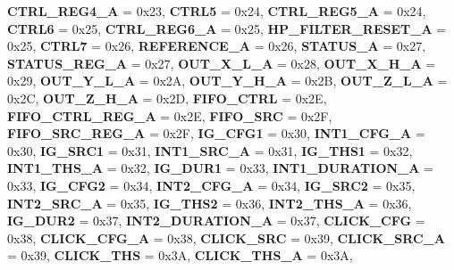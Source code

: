 \begin{DoxyCompactItemize}
{\bfseries C\+T\+R\+L\+\_\+\+R\+E\+G4\+\_\+A} = 0x23, 
{\bfseries C\+T\+R\+L5} = 0x24, 
{\bfseries C\+T\+R\+L\+\_\+\+R\+E\+G5\+\_\+A} = 0x24, 
{\bfseries C\+T\+R\+L6} = 0x25, 
\newline
{\bfseries C\+T\+R\+L\+\_\+\+R\+E\+G6\+\_\+A} = 0x25, 
{\bfseries H\+P\+\_\+\+F\+I\+L\+T\+E\+R\+\_\+\+R\+E\+S\+E\+T\+\_\+A} = 0x25, 
{\bfseries C\+T\+R\+L7} = 0x26, 
{\bfseries R\+E\+F\+E\+R\+E\+N\+C\+E\+\_\+A} = 0x26, 
\newline
{\bfseries S\+T\+A\+T\+U\+S\+\_\+A} = 0x27, 
{\bfseries S\+T\+A\+T\+U\+S\+\_\+\+R\+E\+G\+\_\+A} = 0x27, 
{\bfseries O\+U\+T\+\_\+\+X\+\_\+\+L\+\_\+A} = 0x28, 
{\bfseries O\+U\+T\+\_\+\+X\+\_\+\+H\+\_\+A} = 0x29, 
\newline
{\bfseries O\+U\+T\+\_\+\+Y\+\_\+\+L\+\_\+A} = 0x2A, 
{\bfseries O\+U\+T\+\_\+\+Y\+\_\+\+H\+\_\+A} = 0x2B, 
{\bfseries O\+U\+T\+\_\+\+Z\+\_\+\+L\+\_\+A} = 0x2C, 
{\bfseries O\+U\+T\+\_\+\+Z\+\_\+\+H\+\_\+A} = 0x2D, 
\newline
{\bfseries F\+I\+F\+O\+\_\+\+C\+T\+RL} = 0x2E, 
{\bfseries F\+I\+F\+O\+\_\+\+C\+T\+R\+L\+\_\+\+R\+E\+G\+\_\+A} = 0x2E, 
{\bfseries F\+I\+F\+O\+\_\+\+S\+RC} = 0x2F, 
{\bfseries F\+I\+F\+O\+\_\+\+S\+R\+C\+\_\+\+R\+E\+G\+\_\+A} = 0x2F, 
\newline
{\bfseries I\+G\+\_\+\+C\+F\+G1} = 0x30, 
{\bfseries I\+N\+T1\+\_\+\+C\+F\+G\+\_\+A} = 0x30, 
{\bfseries I\+G\+\_\+\+S\+R\+C1} = 0x31, 
{\bfseries I\+N\+T1\+\_\+\+S\+R\+C\+\_\+A} = 0x31, 
\newline
{\bfseries I\+G\+\_\+\+T\+H\+S1} = 0x32, 
{\bfseries I\+N\+T1\+\_\+\+T\+H\+S\+\_\+A} = 0x32, 
{\bfseries I\+G\+\_\+\+D\+U\+R1} = 0x33, 
{\bfseries I\+N\+T1\+\_\+\+D\+U\+R\+A\+T\+I\+O\+N\+\_\+A} = 0x33, 
\newline
{\bfseries I\+G\+\_\+\+C\+F\+G2} = 0x34, 
{\bfseries I\+N\+T2\+\_\+\+C\+F\+G\+\_\+A} = 0x34, 
{\bfseries I\+G\+\_\+\+S\+R\+C2} = 0x35, 
{\bfseries I\+N\+T2\+\_\+\+S\+R\+C\+\_\+A} = 0x35, 
\newline
{\bfseries I\+G\+\_\+\+T\+H\+S2} = 0x36, 
{\bfseries I\+N\+T2\+\_\+\+T\+H\+S\+\_\+A} = 0x36, 
{\bfseries I\+G\+\_\+\+D\+U\+R2} = 0x37, 
{\bfseries I\+N\+T2\+\_\+\+D\+U\+R\+A\+T\+I\+O\+N\+\_\+A} = 0x37, 
\newline
{\bfseries C\+L\+I\+C\+K\+\_\+\+C\+FG} = 0x38, 
{\bfseries C\+L\+I\+C\+K\+\_\+\+C\+F\+G\+\_\+A} = 0x38, 
{\bfseries C\+L\+I\+C\+K\+\_\+\+S\+RC} = 0x39, 
{\bfseries C\+L\+I\+C\+K\+\_\+\+S\+R\+C\+\_\+A} = 0x39, 
\newline
{\bfseries C\+L\+I\+C\+K\+\_\+\+T\+HS} = 0x3A, 
{\bfseries C\+L\+I\+C\+K\+\_\+\+T\+H\+S\+\_\+A} = 0x3A, 

\end{DoxyCompactItemize}
